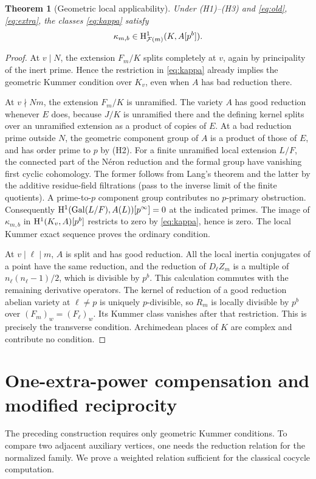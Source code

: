 \documentclass[11pt]{article}
\newtheorem{theorem}{Theorem}[section]
\theoremstyle{definition}\newtheorem{definition}[theorem]{Definition}
\theoremstyle{remark}\newtheorem{remark}[theorem]{Remark}
\newcommand{\Gal}{\operatorname{Gal}}\newcommand{\Res}{\operatorname{Res}}
\begin{document}
\begin{theorem}[Geometric local applicability]\label{thm:local}
Under (H1)--(H3) and \eqref{eq:old}, \eqref{eq:extra}, the classes \eqref{eq:kappa} satisfy
\[
 \kappa_{m,b}\in\mathrm H^1_{\mathcal F(m)}(K,A[p^b]).
\]
\end{theorem}
\begin{proof}
At $v\mid N$, the extension $F_m/K$ splits completely at $v$, again by principality of the inert prime. Hence the restriction in \eqref{eq:kappa} already implies the geometric Kummer condition over $K_v$, even when $A$ has bad reduction there.

At $v\nmid Nm$, the extension $F_m/K$ is unramified. The variety $A$ has good reduction whenever $E$ does, because $J/K$ is unramified there and the defining kernel splits over an unramified extension as a product of copies of $E$. At a bad reduction prime outside $N$, the geometric component group of $A$ is a product of those of $E$, and has order prime to $p$ by (H2). For a finite unramified local extension $L/F$, the connected part of the N\'eron reduction and the formal group have vanishing first cyclic cohomology. The former follows from Lang's theorem and the latter by the additive residue-field filtrations (pass to the inverse limit of the finite quotients). A prime-to-$p$ component group contributes no $p$-primary obstruction. Consequently $\HH^1(\Gal(L/F),A(L))[p^\infty]=0$ at the indicated primes. The image of $\kappa_{m,b}$ in $\mathrm H^1(K_v,A)[p^b]$ restricts to zero by \eqref{eq:kappa}, hence is zero. The local Kummer exact sequence proves the ordinary condition.

At $v\mid\ell\mid m$, $A$ is split and has good reduction. All the local inertia conjugates of a point have the same reduction, and the reduction of $D_\ell Z_m$ is a multiple of $n_\ell(n_\ell-1)/2$, which is divisible by $p^b$. This calculation commutes with the remaining derivative operators. The kernel of reduction of a good reduction abelian variety at $\ell\ne p$ is uniquely $p$-divisible, so $R_m$ is locally divisible by $p^b$ over $(F_m)_w=(F_\ell)_w$. Its Kummer class vanishes after that restriction. This is precisely the transverse condition. Archimedean places of $K$ are complex and contribute no condition.
\end{proof}

\section{One-extra-power compensation and modified reciprocity}
The preceding construction requires only geometric Kummer conditions. To compare two adjacent auxiliary vertices, one needs the reduction relation for the normalized family. We prove a weighted relation sufficient for the classical cocycle computation.
\end{document}
